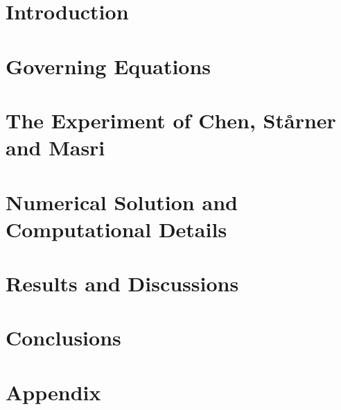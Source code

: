 \documentclass[msc,eng]{ita}    %
\begin{document}
\chapter{Introduction}\label{chap: intro}


\chapter{Governing Equations}\label{chap: equations}


\chapter{The Experiment of Chen, St\aa{}rner and Masri}\label{chap: exp}


\chapter{Numerical Solution and Computational Details}\label{chap: numerical}


\chapter{Results and Discussions}\label{chap: results}


\chapter{Conclusions}\label{chap: conclusion}



\begin{spacing}{1.0}
\begin{flushleft}

\end{flushleft}
\end{spacing}


\appendix
\chapter{Appendix}



\itaglossary
\printglossary
\end{document}
